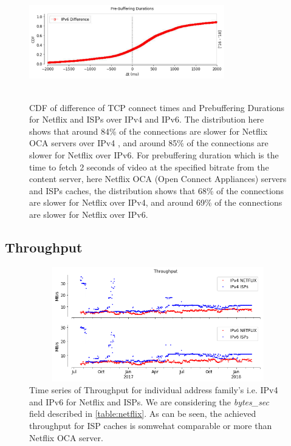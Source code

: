 \begin{figure}
\begin{minipage}{0.5\textwidth}
	\end{minipage}
	\begin{minipage}{0.5\textwidth}
		\centering
		\includegraphics[keepaspectratio, height=5cm, width=8.5cm]{figures/cache/allisps/netflix-pd-diff-all-isps-cdf-v6.pdf}
	\end{minipage}
	\caption[All ISPs Connect Time and Prebuffering Duration CDF Deltas]{CDF of difference of TCP connect times and Prebuffering Durations for Netflix and ISPs over IPv4 and IPv6. The distribution here shows that around 84\% of the connections are slower for Netflix OCA servers over IPv4 , and around 85\% of the connections are slower for Netflix over IPv6. 
For prebuffering duration which is the time to fetch 2 seconds of video at the specified bitrate from the content server, here Netflix OCA (Open Connect Appliances) servers and ISPs caches,
the distribution shows that 68\% of the connections are slower for Netflix over IPv4, and around 69\% of the connections are slower for Netflix over IPv6.}
	\label{fig:All ISPs Connect Time and Prebuffering Duration CDF Deltas}
\end{figure}

\FloatBarrier

\subsection*{Throughput}

\begin{figure}[!ht]
	\centering
	\includegraphics[keepaspectratio, height=5cm, width=15cm]{figures/cache/allisps/netflix-throughput-timeseries-all-isp-separate.png}
	\caption[All ISPs Throughput Timeseries Absolute]{Time series of Throughput for individual address family's i.e. IPv4 and IPv6 for Netflix and ISPs. We are considering 
	the \textit{bytes\_sec} field described in \cref{table:netflix}. As can be seen, the achieved throughput for ISP caches is somwehat comparable or more than Netflix OCA server.}
	\label{fig:All ISPs Throughput Timeseries Absolute}
\end{figure}

